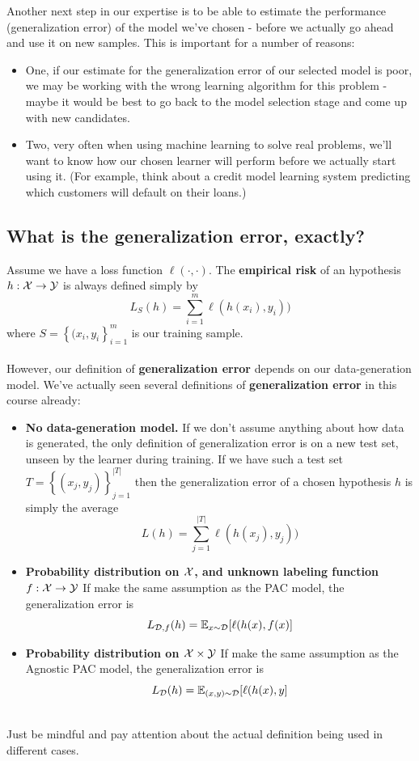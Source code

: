 \documentclass[11pt]{article}
\newcommand{\Dc}{\mathcal{D}}
\begin{document}
Another next step in our expertise is to be able to estimate the performance
(generalization error) of the model we've chosen - before we actually go ahead
and use it on
new samples. This is important for a number
of reasons:
\begin{itemize}
  \item One, if our estimate for the generalization error of our selected
model is poor, we may be working with the wrong
learning algorithm for this problem - maybe it would be best to go back to the
model selection stage and come up with new candidates. 
\item Two, very often when
using machine learning to solve real problems, we'll
want to know how our chosen learner will perform before we actually start using it.
(For example, think about a credit model learning system predicting which
customers will default on their loans.)
\end{itemize}

\subsection{What is the generalization error, exactly?}



Assume we have a loss function $\ell(\cdot,\cdot)$. 
The {\bf empirical risk} of an hypothesis $h:\mathcal{X}\to\mathcal{Y}$ 
is always defined simply by 
\[
L_S(h) = \sum_{i=1}^m \ell(h(x_i),y_i))
\]
where $S=\left\{ (x_i,y_i \right\}_{i=1}^m$ is our training sample.
\\~\\
However, our definition of {\bf generalization error} 
 depends on our data-generation model.
We've actually seen several definitions of {\bf generalization error} 
in this course already:

\begin{itemize}
  \item {\bf No data-generation model.}
    If we don't assume anything about how data is generated, the only definition
    of generalization error is on a new test set, unseen by the learner during
    training. If we have such a test set 
    $T=\left\{ (x_j,y_j) \right\}_{j=1}^{|T|}$
      then the generalization error of a chosen hypothesis $h$ is simply the average 
        \[
        L(h) = \sum_{j=1}^{|T|} \ell(h(x_j),y_j))
\]
\item {\bf Probability distribution on $\mathcal{X}$, and unknown labeling function
  $f:\mathcal{X}\to\mathcal{Y}$}
    If make the same assumption as the PAC model, the generalization error is 
 \[
   L_{\Dc,f}(h) = \E_{x\sim\Dc} [\ell(h(x),f(x)]
\]
\item {\bf Probability distribution on $\mathcal{X}\times \mathcal{Y}$}
    If make the same assumption as the Agnostic PAC model, the generalization error is 
 \[
   L_{\Dc}(h) = \E_{(x,y)\sim\Dc} [\ell(h(x),y]
\]
      
\end{itemize}
~\\
Just be mindful and pay attention about the actual definition being used in
different cases.
\end{document}
